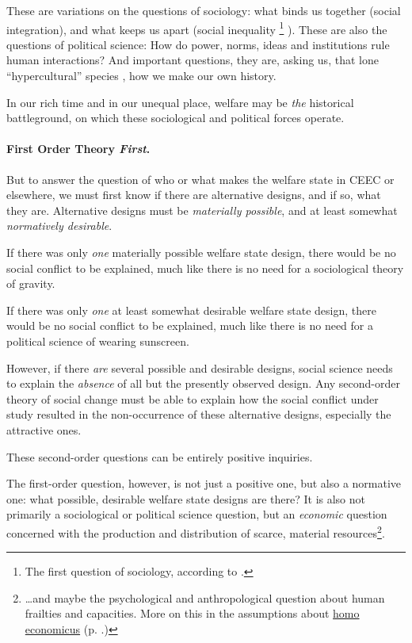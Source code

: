 \documentclass[11pt,a4paper,oneside,openright]{article}
\begin{document}
These are variations on the questions of sociology: 
what binds us together (social integration), and what keeps us apart (social inequality
\footnote{
	The first question of sociology, according to \citep[66]{Dahrendorf1966}.
}
). 
These are also the questions of political science: 
How do power, norms, ideas and institutions rule human interactions? 
And important questions, they are, asking us, that lone ``hypercultural'' species \citep{Henrich2004}, how we make our own history. 

In our rich time and in our unequal place, welfare may be \emph{the} historical battleground, on which these sociological and political forces operate. 

\paragraph{First Order Theory \emph{First}.}
But to answer the question of who or what makes the welfare state in \gls{CEEC} or elsewhere, we must first know if there are alternative designs, and if so, what they are. 
Alternative designs must be \emph{materially possible}, and at least somewhat \emph{normatively desirable}.

If there was only \emph{one} materially possible welfare state design, there would be no social conflict to be explained, much like there is no need for a sociological theory of gravity. 

If there was only \emph{one} at least somewhat desirable welfare state design, there would be no social conflict to be explained, much like there is no need for a political science of wearing sunscreen.

However, if there \emph{are} several possible and desirable designs, social science needs to explain the \emph{absence} of all but the presently observed design. 
Any second-order theory of social change must be able to explain how the social conflict under study resulted in the non-occurrence of these alternative designs, especially the attractive ones. 

These second-order questions can be entirely positive inquiries.

The first-order question, however, is not just a positive one, but also a normative one: 
what possible, desirable welfare state designs are there? 
It is also not primarily a sociological or political science question, but an \emph{economic} question concerned with the production and distribution of scarce, material resources\footnote{
	\ldots and maybe the psychological and anthropological question about human frailties and capacities. More on this in the assumptions about \hyperref[it:homo-economicus]{homo economicus} (p. \pageref{it:homo-economicus}.)
}.
\end{document}
